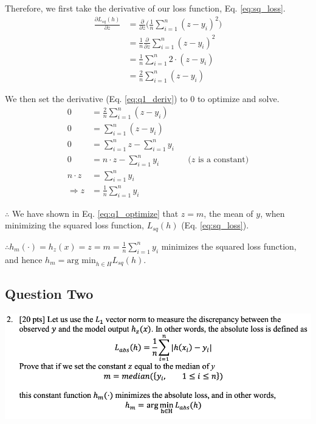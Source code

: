 Therefore, we first take the derivative of our loss function, Eq. \ref{eq:sq_loss}.
\begin{align}
    \frac{\partial L_{sq}(h)}{\partial z} &= \frac{\partial}{\partial z} \Big(\frac{1}{n} \sum_{i=1}^{n} (z-y_i)^2 \Big) \nonumber \label{eq:q1_deriv} \\
    &= \frac{1}{n} \frac{\partial}{\partial z} \sum_{i=1}^{n} (z-y_i)^2  \nonumber \\
    &= \frac{1}{n} \sum_{i=1}^{n} 2 \cdot(z-y_i)  \nonumber \\
    &= \frac{2}{n} \sum_{i=1}^{n} (z-y_i) 
\end{align}

We then set the derivative (Eq. \ref{eq:q1_deriv}) to 0 to optimize and solve.
\begin{align}
    0 &= \frac{2}{n} \sum_{i=1}^{n} (z-y_i) \nonumber \label{eq:q1_optimize} \\
    0 &= \sum_{i=1}^{n} (z-y_i) \nonumber \\
    0 &= \sum_{i=1}^{n} z - \sum_{i=1}^{n} y_i \nonumber \\
    0 &= n \cdot z - \sum_{i=1}^{n} y_i \nonumber && \text{($z$ is a constant)}\\
    n \cdot z &= \sum_{i=1}^{n} y_i \nonumber \\
    \Rightarrow z &= \frac{1}{n }\sum_{i=1}^{n} y_i
\end{align}

$\therefore$ We have shown in Eq. \ref{eq:q1_optimize} that $z = m$, the mean of $y$, when minimizing the squared loss function, $L_{sq}(h)$ (Eq. \ref{eq:sq_loss}).

$\therefore h_m(\cdot) = h_z(x) = z = m = \frac{1}{n }\sum_{i=1}^{n} y_i$ minimizes the squared loss function, and hence $h_m = \text{arg min}_{h \in H} L_{sq}(h)$.

\subsection{Question Two}
\includegraphics[width=1\textwidth]{media/q2.png}


